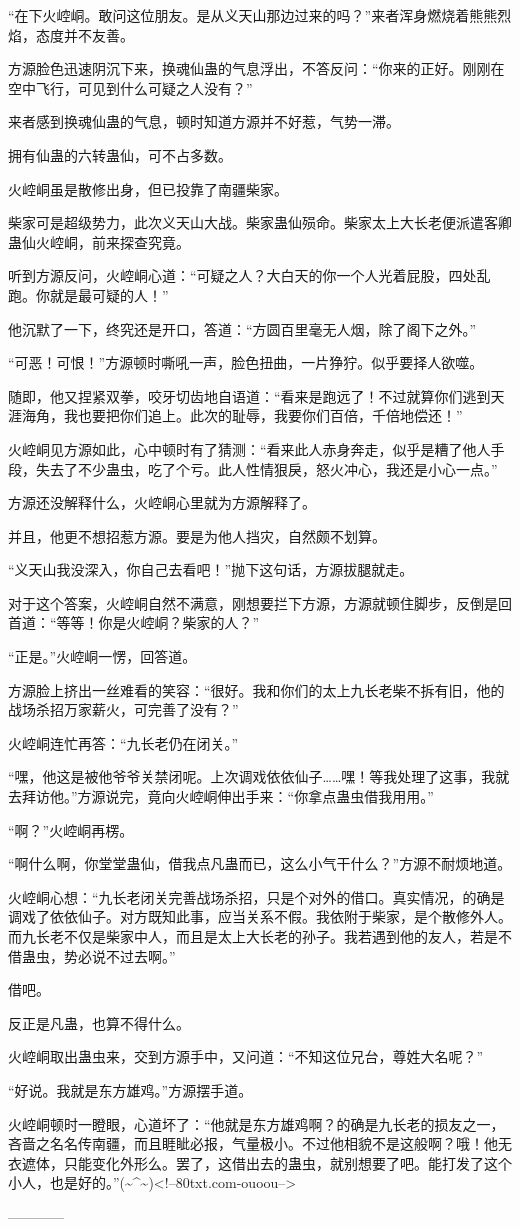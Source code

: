 \begin{this_body}
“在下火崆峒。敢问这位朋友。是从义天山那边过来的吗？”来者浑身燃烧着熊熊烈焰，态度并不友善。

方源脸色迅速阴沉下来，换魂仙蛊的气息浮出，不答反问：“你来的正好。刚刚在空中飞行，可见到什么可疑之人没有？”

来者感到换魂仙蛊的气息，顿时知道方源并不好惹，气势一滞。

拥有仙蛊的六转蛊仙，可不占多数。

火崆峒虽是散修出身，但已投靠了南疆柴家。

柴家可是超级势力，此次义天山大战。柴家蛊仙殒命。柴家太上大长老便派遣客卿蛊仙火崆峒，前来探查究竟。

听到方源反问，火崆峒心道：“可疑之人？大白天的你一个人光着屁股，四处乱跑。你就是最可疑的人！”

他沉默了一下，终究还是开口，答道：“方圆百里毫无人烟，除了阁下之外。”

“可恶！可恨！”方源顿时嘶吼一声，脸色扭曲，一片狰狞。似乎要择人欲噬。

随即，他又捏紧双拳，咬牙切齿地自语道：“看来是跑远了！不过就算你们逃到天涯海角，我也要把你们追上。此次的耻辱，我要你们百倍，千倍地偿还！”

火崆峒见方源如此，心中顿时有了猜测：“看来此人赤身奔走，似乎是糟了他人手段，失去了不少蛊虫，吃了个亏。此人性情狠戾，怒火冲心，我还是小心一点。”

方源还没解释什么，火崆峒心里就为方源解释了。

并且，他更不想招惹方源。要是为他人挡灾，自然颇不划算。

“义天山我没深入，你自己去看吧！”抛下这句话，方源拔腿就走。

对于这个答案，火崆峒自然不满意，刚想要拦下方源，方源就顿住脚步，反倒是回首道：“等等！你是火崆峒？柴家的人？”

“正是。”火崆峒一愣，回答道。

方源脸上挤出一丝难看的笑容：“很好。我和你们的太上九长老柴不拆有旧，他的战场杀招万家薪火，可完善了没有？”

火崆峒连忙再答：“九长老仍在闭关。”

“嘿，他这是被他爷爷关禁闭呢。上次调戏依依仙子……嘿！等我处理了这事，我就去拜访他。”方源说完，竟向火崆峒伸出手来：“你拿点蛊虫借我用用。”

“啊？”火崆峒再楞。

“啊什么啊，你堂堂蛊仙，借我点凡蛊而已，这么小气干什么？”方源不耐烦地道。

火崆峒心想：“九长老闭关完善战场杀招，只是个对外的借口。真实情况，的确是调戏了依依仙子。对方既知此事，应当关系不假。我依附于柴家，是个散修外人。而九长老不仅是柴家中人，而且是太上大长老的孙子。我若遇到他的友人，若是不借蛊虫，势必说不过去啊。”

借吧。

反正是凡蛊，也算不得什么。

火崆峒取出蛊虫来，交到方源手中，又问道：“不知这位兄台，尊姓大名呢？”

“好说。我就是东方雄鸡。”方源摆手道。

火崆峒顿时一瞪眼，心道坏了：“他就是东方雄鸡啊？的确是九长老的损友之一，吝啬之名名传南疆，而且睚眦必报，气量极小。不过他相貌不是这般啊？哦！他无衣遮体，只能变化外形么。罢了，这借出去的蛊虫，就别想要了吧。能打发了这个小人，也是好的。”(\~{}\^{}\~{})<!--80txt.com-ouoou-->

------------

\end{this_body}

